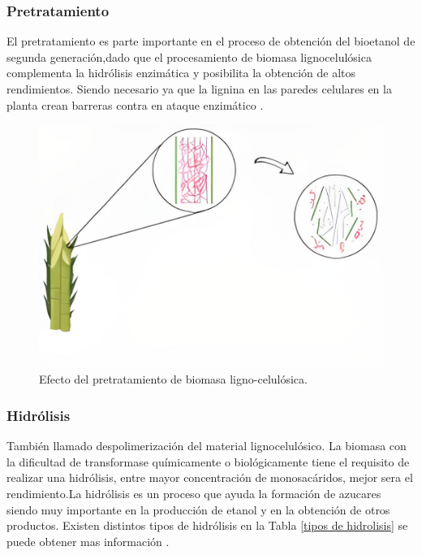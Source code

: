 \documentclass[12pt]{article}
\begin{document}
		\subsubsection{Pretratamiento}
		
		El pretratamiento es parte importante en el proceso de obtención del bioetanol de segunda generación,dado que el procesamiento de biomasa lignocelulósica complementa la hidrólisis enzimática y posibilita la obtención de altos rendimientos. Siendo necesario ya que la lignina en las paredes celulares en la planta crean barreras contra en ataque enzimático \cite{Riano2010produccion}.
		\newline 
		
		\begin{figure}[H]
			\centering
			\includegraphics[width=0.4\linewidth]{imagenes/pretrata_1}
			\caption{Efecto del pretratamiento de biomasa ligno-celulósica.}
			\label{fig:pretrata1}
		\end{figure}
		
		
		\subsubsection{Hidrólisis}
		También llamado despolimerización del material lignocelulósico. La biomasa con la dificultad de transformase químicamente  o biológicamente tiene el requisito de realizar una hidrólisis, entre mayor concentración de monosacáridos, mejor sera el rendimiento.La hidrólisis es un proceso que ayuda la formación de azucares siendo muy importante en la producción de etanol y en la obtención de otros productos. Existen distintos tipos de hidrólisis en la Tabla \ref{tipos de hidrolisis} se puede obtener mas información .
		
\end{document}
